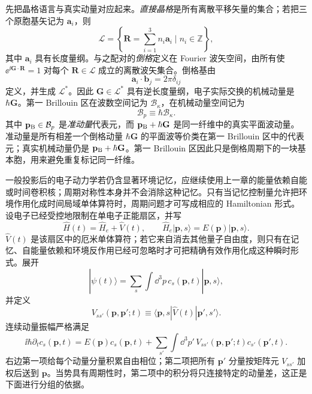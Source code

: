 先把晶格语言与真实动量对应起来。\emph{直接晶格}是所有离散平移矢量的集合；若把三个原胞基矢记为 $\mathbf a_i$，则
\begin{equation*}
\mathcal L=\left\{\mathbf R=\sum_{i=1}^3n_i\mathbf a_i\mid n_i\in\mathbb Z\right\},
\end{equation*}
其中 $\mathbf a_i$ 具有长度量纲。与之配对的\emph{倒格}定义在 Fourier 波矢空间，由所有使 $\ee^{\ii\mathbf G\cdot\mathbf R}=1$ 对每个 $\mathbf R\in\mathcal L$ 成立的离散波矢集合。倒格基由
\begin{equation*}
\mathbf a_i\cdot\mathbf b_j=2\pi\delta_{ij}
\end{equation*}
定义，并生成 $\mathcal L^*$。因此 $\mathbf G\in\mathcal L^*$ 具有逆长度量纲，电子实际交换的机械动量是 $\hbar\mathbf G$。第一 Brillouin 区在波数空间记为 $\mathcal B_{\kappa}$，在机械动量空间记为
\begin{equation*}
\mathcal B_p\equiv\hbar\mathcal B_{\kappa}.
\end{equation*}
其中 $\mathbf p_{\rm B}\in\mathcal B_p$ 是\emph{准动量}代表元，而 $\mathbf p_{\rm B}+\hbar\mathbf G$ 是同一纤维中的真实平面波动量。准动量是所有相差一个倒格动量 $\hbar\mathbf G$ 的平面波等价类在第一 Brillouin 区中的代表元；真实机械动量仍是 $\mathbf p_{\rm B}+\hbar\mathbf G$。第一 Brillouin 区因此只是倒格周期下的一块基本胞，用来避免重复标记同一纤维。

一般投影后的电子动力学若仍含显著环境记忆，应继续使用上一章的能量依赖自能或时间卷积核；周期对称性本身并不会消除这种记忆。只有当记忆控制量允许把环境作用化成时间局域单体算符时，周期问题才可写成相应的 Hamiltonian 形式。设电子已经受控地限制在单电子正能扇区，并写
\begin{equation}
\boxed{
\hat H(t)=\hat H_e+\hat V(t),
\qquad
\hat H_e|\mathbf p,s\rangle=E(\mathbf p)|\mathbf p,s\rangle .}
\label{eq:arbitrary_single_electron_hamiltonian}
\end{equation}
$\hat V(t)$ 是该扇区中的厄米单体算符；若它来自消去其他量子自由度，则只有在记忆、自能量依赖和环境反作用已经可忽略时才可把精确有效作用化成这种瞬时形式。展开
\begin{equation*}
|\psi(t)\rangle=\sum_s\int\dd^3 p\,c_s(\mathbf p,t)|\mathbf p,s\rangle,
\end{equation*}
并定义
\begin{equation*}
V_{ss'}(\mathbf p,\mathbf p';t)
\equiv\langle\mathbf p,s|\hat V(t)|\mathbf p',s'\rangle .
\end{equation*}
连续动量振幅严格满足
\begin{equation}
\boxed{
\ii\hbar\partial_t c_s(\mathbf p,t)
=E(\mathbf p)c_s(\mathbf p,t)
+\sum_{s'}\int\dd^3 p'\,
V_{ss'}(\mathbf p,\mathbf p';t)c_{s'}(\mathbf p',t).}
\label{eq:arbitrary_potential_continuous_momentum_equation}
\end{equation}
右边第一项给每个动量分量积累自由相位；第二项把所有 $\mathbf p'$ 分量按矩阵元 $V_{ss'}$ 加权后送到 $\mathbf p$。当势具有周期性时，第二项中的积分将只连接特定的动量差，这正是下面进行分组的依据。

